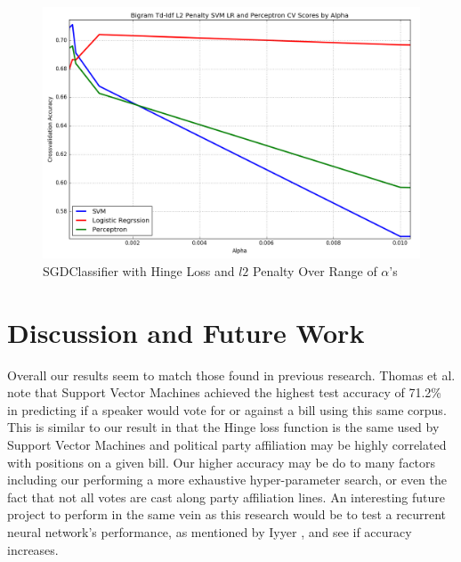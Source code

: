 \documentclass[a4paper, 12pt]{article}
\begin{document}
\begin{figure}[!ht]
\centering
\includegraphics[width=0.5\linewidth]{ZoomedL2NormSVM.png}
\caption[SGDClassifier with Hinge Loss and $l2$ Penalty Over a Range of $\alpha$ ]{SGDClassifier with Hinge Loss and $l2$ Penalty Over Range of $\alpha$'s}
\label{fig: sgd}
\end{figure}

\section{Discussion and Future Work}
Overall our results seem to match those found in previous research. Thomas et al. note \cite{thomas2006get} that Support Vector Machines achieved the highest test accuracy of 71.2\% in predicting if a speaker would vote for or against a bill using this same corpus. This is similar to our result in that the Hinge loss function is the same used by Support Vector Machines and political party affiliation may be highly correlated with positions on a given bill.  Our higher accuracy may be do to many factors including our performing a more exhaustive hyper-parameter search, or even the fact that not all votes are cast along party affiliation lines. An interesting future project to perform in the same vein as this research would be to test a recurrent neural network's performance, as mentioned by Iyyer \cite{iyyer2014political}, and see if accuracy increases. 
\newpage


\end{document}
